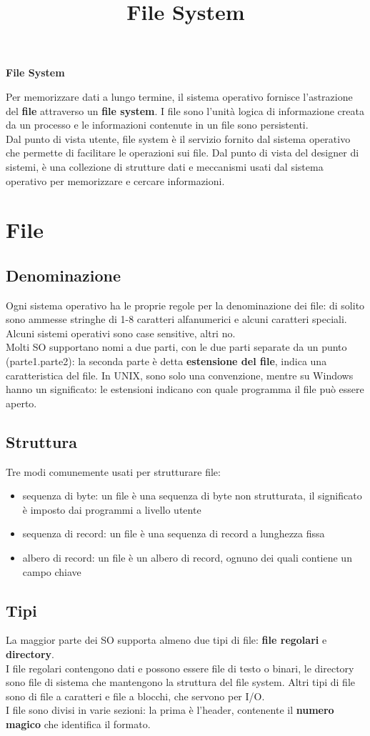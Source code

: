\documentclass[12pt]{article}
\title{File System}
\begin{document}
\begin{center}
    \huge\textbf{File System}
\end{center}
Per memorizzare dati a lungo termine, il sistema operativo fornisce l'astrazione del \textbf{file} attraverso un 
\textbf{file system}. I file sono l'unità logica di informazione creata da un processo e le informazioni contenute
in un file sono persistenti.\\
Dal punto di vista utente, file system è il servizio fornito dal sistema operativo che permette di facilitare le 
operazioni sui file. Dal punto di vista del designer di sistemi, è una collezione di strutture dati e meccanismi
usati dal sistema operativo per memorizzare e cercare informazioni. 
\section{File}
\subsection{Denominazione}
Ogni sistema operativo ha le proprie regole per la denominazione dei file: di solito sono ammesse stringhe di 1-8 
caratteri alfanumerici e alcuni caratteri speciali. Alcuni sistemi operativi sono case sensitive, altri no.\\
Molti SO supportano nomi a due parti, con le due parti separate da un punto (parte1.parte2): la seconda parte è
detta \textbf{estensione del file}, indica una caratteristica del file. In UNIX, sono solo una convenzione, mentre 
su Windows hanno un significato: le estensioni indicano con quale programma il file può essere aperto.
\subsection{Struttura}
Tre modi comunemente usati per strutturare file:
\begin{itemize}
    \item sequenza di byte: un file è una sequenza di byte non strutturata, il significato è imposto dai programmi a
    livello utente
    \item sequenza di record: un file è una sequenza di record a lunghezza fissa
    \item albero di record: un file è un albero di record, ognuno dei quali contiene un campo chiave
\end{itemize}
\subsection{Tipi}
La maggior parte dei SO supporta almeno due tipi di file: \textbf{file regolari} e \textbf{directory}.\\
I file regolari contengono dati e possono essere file di testo o binari, le directory sono file di sistema che
mantengono la struttura del file system. Altri tipi di file sono di file a caratteri e file a blocchi, che servono 
per I/O.\\
I file sono divisi in varie sezioni: la prima è l'header, contenente il \textbf{numero magico} che identifica il
formato.
\end{document}
